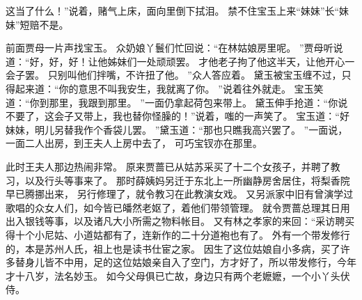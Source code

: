 这当了什么！”说着，赌气上床，面向里倒下拭泪。
禁不住宝玉上来“妹妹”长“妹妹”短赔不是。
\par
前面贾母一片声找宝玉。
众奶娘丫鬟们忙回说：“在林姑娘房里呢。
”贾母听说道：“好，好，好！让他姊妹们一处顽顽罢。
才他老子拘了他这半天，让他开心一会子罢。
只别叫他们拌嘴，不许扭了他。
”众人答应着。
黛玉被宝玉缠不过，只得起来道：“你的意思不叫我安生，我就离了你。
”说着往外就走。
宝玉笑道：“你到那里，我跟到那里。
”一面仍拿起荷包来带上。
黛玉伸手抢道：“你说不要了，这会子又带上，我也替你怪臊的！”说着，嗤的一声笑了。
宝玉道：“好妹妹，明儿另替我作个香袋儿罢。
”黛玉道：“那也只瞧我高兴罢了。
”一面说，一面二人出房，到王夫人上房中去了，
可巧宝钗亦在那里。
\par
此时王夫人那边热闹非常。
原来贾蔷已从姑苏采买了十二个女孩子，并聘了教习，以及行头等事来了。
那时薛姨妈另迁于东北上一所幽静房舍居住，将梨香院早已腾挪出来，
另行修理了，就令教习在此教演女戏。
又另派家中旧有曾演学过歌唱的众女人们，如今皆已皤然老妪了，着他们带领管理。
就令贾蔷总理其日用出入银钱等事，以及诸凡大小所需之物料帐目。
又有林之孝家的来回：“采访聘买得十个小尼姑、小道姑都有了，连新作的二十分道袍也有了。
外有一个带发修行的，本是苏州人氏，祖上也是读书仕宦之家。
因生了这位姑娘自小多病，买了许多替身儿皆不中用，足的这位姑娘亲自入了空门，方才好了，所以带发修行，今年才十八岁，法名妙玉。
如今父母俱已亡故，身边只有两个老嬷嬷，一个小丫头伏侍。
